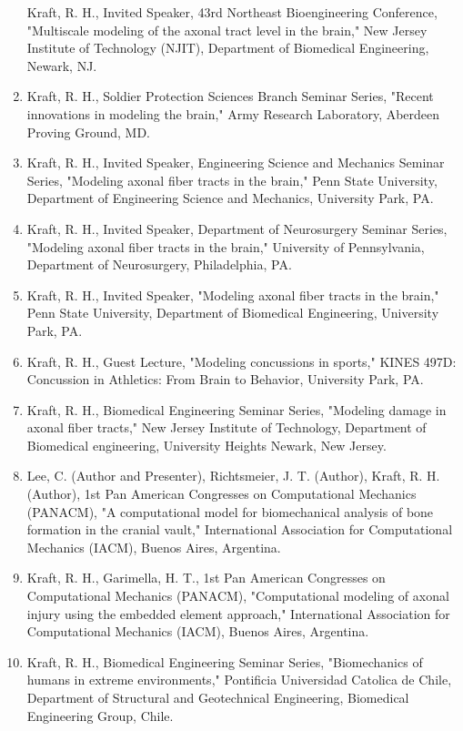 \documentclass[
]{article}
\begin{document}
\begin{enumerate}
  Kraft, R. H., Invited Speaker, 43rd Northeast Bioengineering
  Conference, "Multiscale modeling of the axonal tract level in the
  brain," New Jersey Institute of Technology (NJIT), Department of
  Biomedical Engineering, Newark, NJ.
\item
  Kraft, R. H., Soldier Protection Sciences Branch Seminar Series,
  "Recent innovations in modeling the brain," Army Research Laboratory,
  Aberdeen Proving Ground, MD.
\item
  Kraft, R. H., Invited Speaker, Engineering Science and Mechanics
  Seminar Series, "Modeling axonal fiber tracts in the brain," Penn
  State University, Department of Engineering Science and Mechanics,
  University Park, PA.
\item
  Kraft, R. H., Invited Speaker, Department of Neurosurgery Seminar
  Series, "Modeling axonal fiber tracts in the brain," University of
  Pennsylvania, Department of Neurosurgery, Philadelphia, PA.
\item
  Kraft, R. H., Invited Speaker, "Modeling axonal fiber tracts in the
  brain," Penn State University, Department of Biomedical Engineering,
  University Park, PA.
\item
  Kraft, R. H., Guest Lecture, "Modeling concussions in sports," KINES
  497D: Concussion in Athletics: From Brain to Behavior, University
  Park, PA.
\item
  Kraft, R. H., Biomedical Engineering Seminar Series, "Modeling damage
  in axonal fiber tracts," New Jersey Institute of Technology,
  Department of Biomedical engineering, University Heights Newark, New
  Jersey.
\item
  Lee, C. (Author and Presenter), Richtsmeier, J. T. (Author), Kraft, R.
  H. (Author), 1st Pan American Congresses on Computational Mechanics
  (PANACM), "A computational model for biomechanical analysis of bone
  formation in the cranial vault," International Association for
  Computational Mechanics (IACM), Buenos Aires, Argentina.
\item
  Kraft, R. H., Garimella, H. T., 1st Pan American Congresses on
  Computational Mechanics (PANACM), "Computational modeling of axonal
  injury using the embedded element approach," International Association
  for Computational Mechanics (IACM), Buenos Aires, Argentina.
\item
  Kraft, R. H., Biomedical Engineering Seminar Series, "Biomechanics of
  humans in extreme environments," Pontificia Universidad Catolica de
  Chile, Department of Structural and Geotechnical Engineering,
  Biomedical Engineering Group, Chile.

\end{enumerate}
\end{document}
